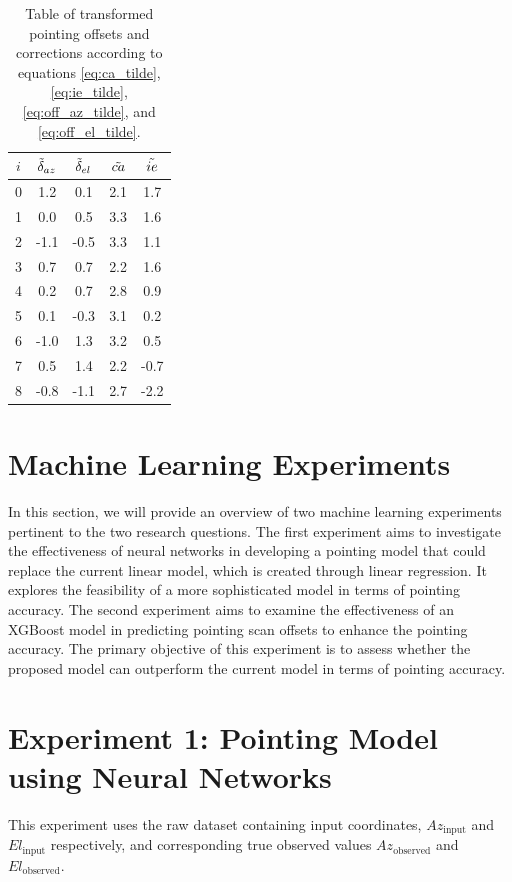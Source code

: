 \begin{table}[H]
    \centering
    \caption{Table of transformed pointing offsets and corrections according to equations \eqref{eq:ca_tilde}, \eqref{eq:ie_tilde}, \eqref{eq:off_az_tilde}, and \eqref{eq:off_el_tilde}.}
    \label{tab:tranform_offsets}
\begin{tabular}{ccccc}
\toprule
$i$ & $\Tilde{\delta}_{az}$ &  $\Tilde{\delta}_{el}$ &  $\Tilde{ca}$ &  $\Tilde{ie}$ \\
\midrule
0 &       1.2 &       0.1 &       2.1 &       1.7 \\
1 &       0.0 &       0.5 &       3.3 &       1.6 \\
2 &      -1.1 &      -0.5 &       3.3 &       1.1 \\
3 &       0.7 &       0.7 &       2.2 &       1.6 \\
4 &       0.2 &       0.7 &       2.8 &       0.9 \\
5 &       0.1 &      -0.3 &       3.1 &       0.2 \\
6 &      -1.0 &       1.3 &       3.2 &       0.5 \\
7 &       0.5 &       1.4 &       2.2 &      -0.7 \\
8 &      -0.8 &      -1.1 &       2.7 &      -2.2 \\
\bottomrule
\end{tabular}
\end{table}


\section{Machine Learning Experiments}
In this section, we will provide an overview of two machine learning experiments pertinent to the two research questions.
The first experiment aims to investigate the effectiveness of neural networks in developing a pointing model that could replace the current linear model, which is created through linear regression.
It explores the feasibility of a more sophisticated model in terms of pointing accuracy.
The second experiment aims to examine the effectiveness of an XGBoost model in predicting pointing scan offsets to enhance the pointing accuracy.
The primary objective of this experiment is to assess whether the proposed model can outperform the current model in terms of pointing accuracy.

\section{Experiment 1: Pointing Model using Neural Networks}
This experiment uses the raw dataset containing input coordinates, $Az_{\text{input}}$ and $El_{\text{input}}$ respectively, and corresponding true observed values $Az_{\text{observed}}$ and $El_{\text{observed}}$.

